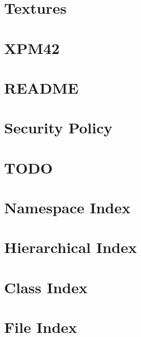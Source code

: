 \documentclass[twoside]{book}
\newcommand{\+}{\discretionary{\mbox{\scriptsize$\hookleftarrow$}}{}{}}
\begin{document}
\chapter{Textures}
\label{md__home_ssergiu_projects_cub3d_external_MLX42_docs_Textures}

\chapter{XPM42}
\label{md__home_ssergiu_projects_cub3d_external_MLX42_docs_XPM42}

\chapter{README}
\label{md__home_ssergiu_projects_cub3d_external_MLX42_README}

\chapter{Security Policy}
\label{md__home_ssergiu_projects_cub3d_external_MLX42_SECURITY}

\chapter{TODO}
\label{md__home_ssergiu_projects_cub3d_TODO}

\chapter{Namespace Index}

\chapter{Hierarchical Index}

\chapter{Class Index}

\chapter{File Index}

\end{document}
